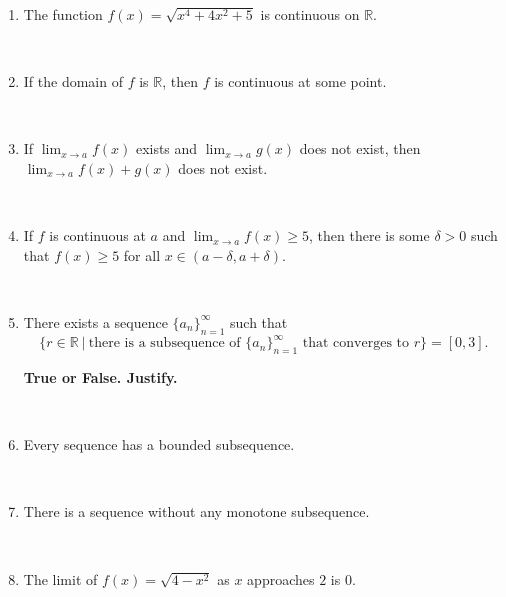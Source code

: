 \documentclass[12pt]{amsart}
\newcommand{\R}{{\mathbb{R}}}
\numberwithin{equation}{section}
\theoremstyle{plain} %
\theoremstyle{definition}
\theoremstyle{remark}
\begin{document}
\begin{enumerate}
	 \
	
	 \item  The function $f(x) = \sqrt{ x^4 + 4x^2 +5}$ is continuous on $\R$.
	 
	 \
	 
	 	 \item  If the domain of $f$ is $\R$, then $f$ is continuous at some point.
	 
	 \	
	 
	 		\item If $\lim_{x\to a} f(x)$ exists and $\lim_{x\to a} g(x)$ does not exist, then $\lim_{x\to a} f(x) + g(x)$ does not exist.
	
	\
	 
	 	 \item  If $f$ is continuous at $a$ and $\lim_{x\to a} f(x) \geq 5$, then there is some $\delta>0$ such that $f(x)\geq 5 $ for all $x\in (a-\delta,a+\delta)$.
	 
	 \
	 
	 \item There exists a sequence $\{a_n\}_{n=1}^\infty$ such that 
	 \[ \{ r\in\R \ | \ \text{there is a subsequence of $\{a_n\}_{n=1}^\infty$ that converges to $r$} \} = [0,3].\]
	 
	 \newpage
	 
	  \thispagestyle{empty}
	 
	 {\large \textbf{True or False. Justify.}}


\
	
	\item  Every sequence has a bounded subsequence.
	
	\
	
	
	
	\item  There is a sequence without any monotone subsequence.
	
	\
	
	
	
	
	

	
	\item  The limit of $f(x)=\sqrt{4-x^2}$ as $x$ approaches $2$ is $0$.
	
	\
	


\end{enumerate}
\end{document}

